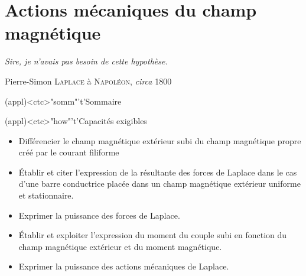 \documentclass[../../main/main.tex]{subfiles}
\begin{document}
\setcounter{chapter}{1}


\chapter{Actions mécaniques du champ magnétique}
\label{ch:ind_meca}
\epigraph{\openquote\textit{%
		Sire, je n’avais pas besoin de cette hypothèse.
	}%
	\closequote}{Pierre-Simon \textsc{Laplace} à \textsc{Napoléon}, \textit{circa} 1800}

\vspace*{\fill}

\begin{tcn}(appl)<ctc>"somm"'t'{Sommaire}
	\let\item\olditem
	\vspace{-15pt}
	\minitoc
	\vspace{-25pt}
\end{tcn}

\begin{tcn}[sidebyside, fontupper=\small, fontlower=\small](appl)<ctc>"how"'t'{Capacités exigibles}
	\begin{itemize}[label=\rcheck]
		\item Différencier le champ magnétique extérieur subi du champ magnétique
		      propre créé par le courant filiforme

		\item Établir et citer l’expression de la résultante des forces de Laplace
		      dans le cas d’une barre conductrice placée dans un champ magnétique
		      extérieur uniforme et stationnaire.
	\end{itemize}
	\tcblower
	\begin{itemize}[label=\rcheck]
		\item Exprimer la puissance des forces de Laplace.

		\item Établir et exploiter l’expression du moment du couple subi en fonction
		      du champ magnétique extérieur et du moment magnétique.

		\item Exprimer la puissance des actions mécaniques de Laplace.
	\end{itemize}
\end{tcn}

\vspace{-15pt}
\end{document}
